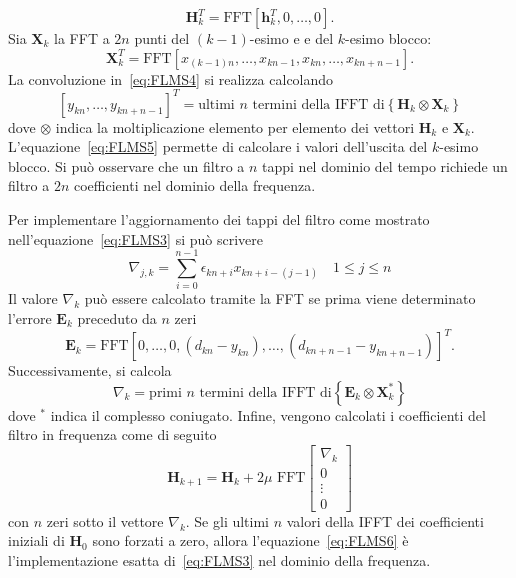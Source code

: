 \documentclass[12pt,a4paper,titlepage]{article}
\begin{document}
\begin{equation*}
\mathbf{H}_k^T = \text{FFT}[\mathbf{h}_k^T, 0, \dots, 0].
\end{equation*} 
Sia $\mathbf{X}_k$ la FFT a $2n$ punti del $(k-1)$-esimo e e del $k$-esimo blocco:
\begin{equation*}
\mathbf{X}_k^T = \text{FFT}[x_{(k-1)n}, \dots, x_{kn-1}, x_{kn}, \dots, x_{kn+n-1}].
\end{equation*}
La convoluzione in~\eqref{eq:FLMS4} si realizza calcolando
\begin{equation}\label{eq:FLMS5}
[y_{kn}, \dots, y_{kn+n-1}]^T = \text{ultimi }n\text{ termini della IFFT di}\left\{\mathbf{H}_k\otimes \mathbf{X}_k\right\}  
\end{equation}
dove $\otimes$ indica la moltiplicazione elemento per elemento dei vettori $\mathbf{H}_k$ e $\mathbf{X}_k$. L'equazione~\eqref{eq:FLMS5} permette di calcolare i valori dell'uscita del $k$-esimo blocco. Si può osservare che un filtro a $n$ tappi nel dominio del tempo richiede un filtro a $2n$ coefficienti nel dominio della frequenza.

Per implementare l'aggiornamento dei tappi del filtro come mostrato nell'equazione~\eqref{eq:FLMS3} si può scrivere
\begin{equation*}
\nabla_{j,k} = \sum_{i = 0}^{n-1}\epsilon_{kn+i}x_{kn+i-(j-1)} \quad 1 \leq j \leq n
\end{equation*}
Il valore $\nabla_{k}$ può essere calcolato tramite la FFT se prima viene determinato l'errore $\mathbf{E}_k$ preceduto da $n$ zeri
\begin{equation*}
\mathbf{E}_k = \text{FFT} [0, \dots, 0, (d_{kn}-y_{kn}), \dots, (d_{kn+n-1}-y_{kn+n-1})]^T.
\end{equation*}
Successivamente, si calcola 
\begin{equation*}
\nabla_{k} = \text{primi }n\text{ termini della IFFT di}\left\{\mathbf{E}_k\otimes \mathbf{X}^*_k\right\}  
\end{equation*}
dove $^*$ indica il complesso coniugato. Infine, vengono calcolati i coefficienti del filtro in frequenza come di seguito
\begin{equation}\label{eq:FLMS6}
\mathbf{H}_{k+1} = \mathbf{H}_k + 2 \mu \text{ FFT} 
\begin{bmatrix}
\nabla_k\\
0\\
\vdots\\
0
\end{bmatrix}
\end{equation}
con $n$ zeri sotto il vettore $\nabla_k$. Se gli ultimi $n$ valori della IFFT dei coefficienti iniziali di $\mathbf{H}_0$ sono forzati a zero, allora l'equazione~\eqref{eq:FLMS6} è l'implementazione esatta di~\eqref{eq:FLMS3} nel dominio della frequenza.
\end{document}
